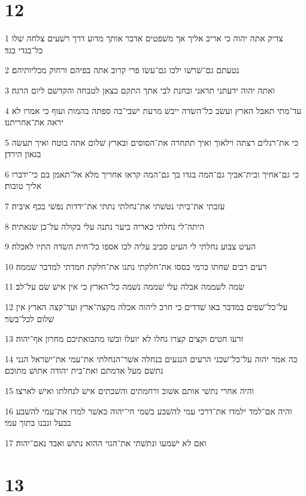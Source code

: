 \chapter{12}

\par 1 צדיק אתה יהוה כי אריב אליך אך משׁפטים אדבר אותך מדוע דרך רשׁעים צלחה שׁלו כל־בגדי בגד׃
\par 2 נטעתם גם־שׁרשׁו ילכו גם־עשׂו פרי קרוב אתה בפיהם ורחוק מכליותיהם׃
\par 3 ואתה יהוה ידעתני תראני ובחנת לבי אתך התקם כצאן לטבחה והקדשׁם ליום הרגה׃
\par 4 עד־מתי תאבל הארץ ועשׂב כל־השׂדה ייבשׁ מרעת ישׁבי־בה ספתה בהמות ועוף כי אמרו לא יראה את־אחריתנו׃
\par 5 כי את־רגלים רצתה וילאוך ואיך תתחרה את־הסוסים ובארץ שׁלום אתה בוטח ואיך תעשׂה בגאון הירדן׃
\par 6 כי גם־אחיך ובית־אביך גם־המה בגדו בך גם־המה קראו אחריך מלא אל־תאמן בם כי־ידברו אליך טובות׃
\par 7 עזבתי את־ביתי נטשׁתי את־נחלתי נתתי את־ידדות נפשׁי בכף איביה׃
\par 8 היתה־לי נחלתי כאריה ביער נתנה עלי בקולה על־כן שׂנאתיה׃
\par 9 העיט צבוע נחלתי לי העיט סביב עליה לכו אספו כל־חית השׂדה התיו לאכלה׃
\par 10 רעים רבים שׁחתו כרמי בססו את־חלקתי נתנו את־חלקת חמדתי למדבר שׁממה׃
\par 11 שׂמה לשׁממה אבלה עלי שׁממה נשׁמה כל־הארץ כי אין אישׁ שׂם על־לב׃
\par 12 על־כל־שׁפים במדבר באו שׁדדים כי חרב ליהוה אכלה מקצה־ארץ ועד־קצה הארץ אין שׁלום לכל־בשׂר׃
\par 13 זרעו חטים וקצים קצרו נחלו לא יועלו ובשׁו מתבואתיכם מחרון אף־יהוה׃
\par 14 כה אמר יהוה על־כל־שׁכני הרעים הנגעים בנחלה אשׁר־הנחלתי את־עמי את־ישׂראל הנני נתשׁם מעל אדמתם ואת־בית יהודה אתושׁ מתוכם׃
\par 15 והיה אחרי נתשׁי אותם אשׁוב ורחמתים והשׁבתים אישׁ לנחלתו ואישׁ לארצו׃
\par 16 והיה אם־למד ילמדו את־דרכי עמי להשׁבע בשׁמי חי־יהוה כאשׁר למדו את־עמי להשׁבע בבעל ונבנו בתוך עמי׃
\par 17 ואם לא ישׁמעו ונתשׁתי את־הגוי ההוא נתושׁ ואבד נאם־יהוה׃

\chapter{13}

